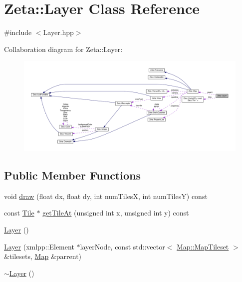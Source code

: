 \hypertarget{classZeta_1_1Layer}{\section{Zeta\+:\+:Layer Class Reference}
\label{classZeta_1_1Layer}
}


{\ttfamily \#include $<$Layer.\+hpp$>$}



Collaboration diagram for Zeta\+:\+:Layer\+:\nopagebreak
\begin{figure}[H]
\begin{center}
\leavevmode
\includegraphics[width=350pt]{classZeta_1_1Layer__coll__graph}
\end{center}
\end{figure}
\subsection*{Public Member Functions}
\begin{DoxyCompactItemize}
\item 
void \hyperlink{classZeta_1_1Layer_a41fad4b82a3b0025907251d119a2c139}{draw} (float dx, float dy, int num\+Tiles\+X, int num\+Tiles\+Y) const 
\item 
const \hyperlink{classZeta_1_1Tile}{Tile} $\ast$ \hyperlink{classZeta_1_1Layer_ade1096e346e20c5ac5c082544e67f2ad}{get\+Tile\+At} (unsigned int x, unsigned int y) const 
\item 
\hyperlink{classZeta_1_1Layer_ac6a5b93d3d8f47b9a49f9f59c6ddd878}{Layer} ()
\item 
\hyperlink{classZeta_1_1Layer_a6cc3e826eaed2a4db87cea49ab5617e1}{Layer} (xmlpp\+::\+Element $\ast$layer\+Node, const std\+::vector$<$ \hyperlink{structZeta_1_1Map_1_1MapTileset}{Map\+::\+Map\+Tileset} $>$ \&tilesets, \hyperlink{classZeta_1_1Map}{Map} \&parrent)
\item 
\hyperlink{classZeta_1_1Layer_a43cd99220b952a50c4726165813493ec}{$\sim$\+Layer} ()
\end{DoxyCompactItemize}
